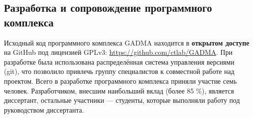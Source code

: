 \begin{table}[ht]
    \centering
    \caption{Ограничения программного комплекса GADMA при использовании разных движков}
    \label{tab:part5:limitations}
\end{table}

\vspace{-0.5cm}
\subsection{Разработка и сопровождение программного комплекса}

Исходный код программного комплекса GADMA находится в \textbf{открытом доступе} на GitHub под лицензией GPLv3: \url{https://github.com/ctlab/GADMA}.
При разработке была использована распределённая система управления версиями (git), что позволило привлечь группу специалистов к совместной работе над проектом.
Всего в разработке программного комплекса приняли участие семь человек.
Разработчиком, внесшим наибольший вклад (более 85 \%), является диссертант, остальные участники --- студенты, которые выполняли работу под руководством диссертанта.

